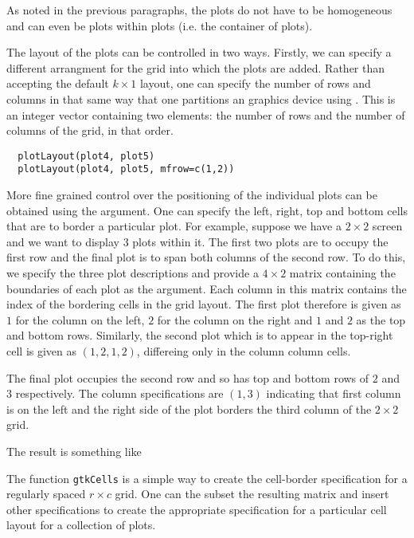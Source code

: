 \documentclass{article}
\def\SFunction#1{{\texttt{\red #1}}}
\begin{document}
As noted in the previous paragraphs, the plots do not have to be
homogeneous and can even be plots within plots (i.e. the container of
plots).


The layout of the plots can be controlled in two ways.  Firstly, we
can specify a different arrangment for the grid into which the plots
are added.  Rather than accepting the default $k \times 1$ layout, one
can specify the number of rows and columns in that same way that one
partitions an \R{} graphics device using .  This is an
integer vector containing two elements: the number of rows and the
number of columns of the grid, in that order.

\begin{verbatim}
  plotLayout(plot4, plot5)
  plotLayout(plot4, plot5, mfrow=c(1,2))
\end{verbatim}


More fine grained control over the positioning of the individual plots
can be obtained using the  argument. One can specify the
left, right, top and bottom cells that are to border a particular
plot.  For example, suppose we have a $2 \times 2$ screen and we want
to display 3 plots within it.  The first two plots are to occupy the
first row and the final plot is to span both columns of the second
row. To do this, we specify the three plot descriptions and provide a
$4 \times 2$ matrix containing the boundaries of each plot as the
 argument.  Each column in this matrix contains the index
of the bordering cells in the grid layout. The first plot therefore is
given as $1$ for the column on the left, $2$ for the column on the
right and $1$ and $2$ as the top and bottom rows.  Similarly, the
second plot which is to appear in the top-right cell is given as $(1,
2, 1, 2)$, differeing only in the column column cells.

The final plot occupies the second row and so has top and bottom rows
of $2$ and $3$ respectively.  The column specifications are $(1, 3)$
indicating that first column is on the left and the right side of the
plot borders the third column of the $2 \times 2$ grid.


The result is something like


The function \SFunction{gtkCells} is a simple way to create the
cell-border specification for a regularly spaced $r \times c$ grid.
One can the subset the resulting matrix and insert other
specifications to create the appropriate specification for a
particular cell layout for a collection of plots.
\end{document}
